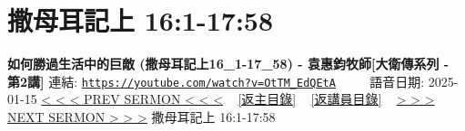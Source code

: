 \documentclass{book}
\begin{document}
\section{撒母耳記上 16:1-17:58}
\label{sec:OtTM_EdQEtA}
\textbf{如何勝過生活中的巨敵 (撒母耳記上16\_1-17\_58) - 袁惠鈞牧師[大衛傳系列 - 第2講]}
\newline
\newline
連結: \href{https://youtube.com/watch?v=OtTM_EdQEtA}{\texttt{https://youtube.com/watch?v=OtTM\_EdQEtA}} ~~~~ 語音日期: 2025-01-15
\newline
\newline
\hyperref[sec:8Xvna8FV9_s]{< < < PREV SERMON < < <}
~
\hyperlink{toc}{[返主目錄]}
~
\hyperref[ch:preacher11]{[返講員目錄]}
~
\hyperref[sec:9t69tF6ci0k]{> > > NEXT SERMON > > >}
\newline
\newline
撒母耳記上 16:1-17:58
\newline
\end{document}

